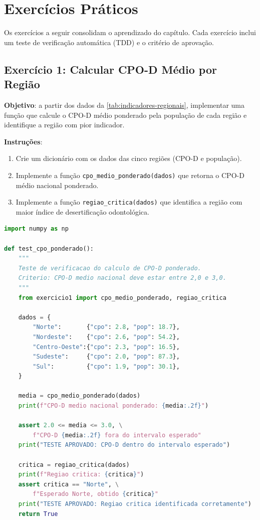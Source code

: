 \section{Exercícios Práticos}
\label{sec:exercicios14}

Os exercícios a seguir consolidam o aprendizado do capítulo. Cada
exercício inclui um teste de verificação automática (TDD) e o
critério de aprovação.

\subsection*{Exercício 1: Calcular CPO-D Médio por Região}

\textbf{Objetivo}: a partir dos dados da \autoref{tab:indicadores-regionais},
implementar uma função que calcule o CPO-D médio ponderado pela
população de cada região e identifique a região com pior indicador.

\textbf{Instruções}:
\begin{enumerate}
    \item Crie um dicionário com os dados das cinco regiões (CPO-D e
        população).
    \item Implemente a função \texttt{cpo\_medio\_ponderado(dados)} que
        retorna o CPO-D médio nacional ponderado.
    \item Implemente a função \texttt{regiao\_critica(dados)} que
        identifica a região com maior índice de desertificação
        odontológica.
\end{enumerate}

\begin{lstlisting}[language=Python, caption={Teste TDD para cálculo de CPO-D ponderado (Exercício 1)}, label={lst:ex1_test}]
import numpy as np

def test_cpo_ponderado():
    """
    Teste de verificacao do calculo de CPO-D ponderado.
    Criterio: CPO-D medio nacional deve estar entre 2,0 e 3,0.
    """
    from exercicio1 import cpo_medio_ponderado, regiao_critica

    dados = {
        "Norte":       {"cpo": 2.8, "pop": 18.7},
        "Nordeste":    {"cpo": 2.6, "pop": 54.2},
        "Centro-Oeste":{"cpo": 2.3, "pop": 16.5},
        "Sudeste":     {"cpo": 2.0, "pop": 87.3},
        "Sul":         {"cpo": 1.9, "pop": 30.1},
    }

    media = cpo_medio_ponderado(dados)
    print(f"CPO-D medio nacional ponderado: {media:.2f}")

    assert 2.0 <= media <= 3.0, \
        f"CPO-D {media:.2f} fora do intervalo esperado"
    print("TESTE APROVADO: CPO-D dentro do intervalo esperado")

    critica = regiao_critica(dados)
    print(f"Regiao critica: {critica}")
    assert critica == "Norte", \
        f"Esperado Norte, obtido {critica}"
    print("TESTE APROVADO: Regiao critica identificada corretamente")
    return True
\end{lstlisting}

